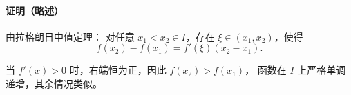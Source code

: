 \begin{proofbox}
\paragraph{证明（略述）}

由拉格朗日中值定理：  
对任意 $x_1 < x_2 \in I$，存在 $\xi \in (x_1,x_2)$，使得
\[
f(x_2)-f(x_1)=f'(\xi)(x_2-x_1).
\]

当 $f'(x)>0$ 时，右端恒为正，因此 $f(x_2)>f(x_1)$，
函数在 $I$ 上严格单调递增，其余情况类似。
\end{proofbox}

